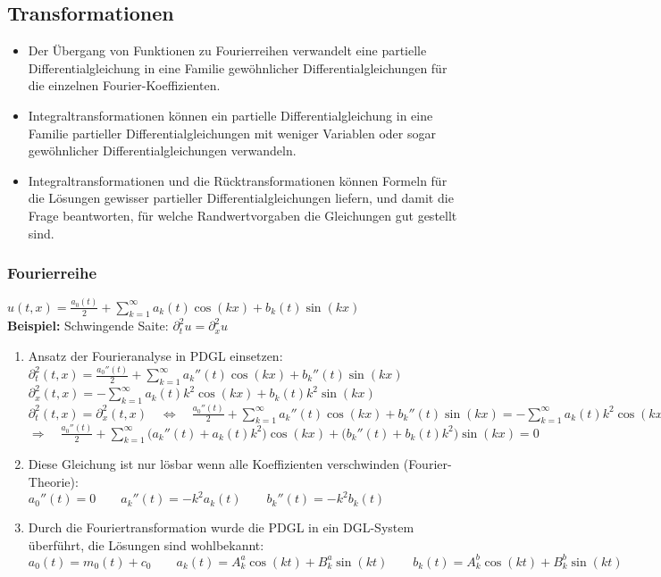 \subsection{Transformationen}


\begin{itemize}
\item Der Übergang von Funktionen zu Fourierreihen verwandelt eine partielle
Differentialgleichung in eine Familie gewöhnlicher Differentialgleichungen für
die einzelnen Fourier-Koeffizienten.
\item Integraltransformationen können ein partielle Differentialgleichung in eine
Familie partieller Differentialgleichungen mit weniger Variablen oder sogar
gewöhnlicher Differentialgleichungen verwandeln.
\item Integraltransformationen und die Rücktransformationen können Formeln
für die Lösungen gewisser partieller Differentialgleichungen liefern, und
damit die Frage beantworten, für welche Randwertvorgaben die Gleichungen
gut gestellt sind.
\end{itemize}

\subsubsection{Fourierreihe}

$\boxed{u(t,x)=\frac{a_0(t)}{2}+\sum\limits_{k=1}^{\infty}{a_k(t)\cos(kx)+b_k(t)\sin(kx)}}$\\[0.4cm]

\textbf{Beispiel:} Schwingende Saite: $\boxed{\partial_t^2u=\partial_x^2u}$

\begin{enumerate}
\item Ansatz der Fourieranalyse in PDGL einsetzen:\\
$\partial_t^2(t,x)=\frac{a_0''(t)}{2}+\sum\limits_{k=1}^{\infty}{a_k''(t)\cos(kx)+b_k''(t)\sin(kx)}$\\
$\partial_x^2(t,x)=-\sum\limits_{k=1}^{\infty}{a_k(t)k^2\cos(kx)+b_k(t)k^2\sin(kx)}$\\
$\partial_t^2(t,x)=\partial_x^2(t,x) 
\quad \Leftrightarrow \quad \frac{a_0''(t)}{2}+\sum\limits_{k=1}^{\infty}{a_k''(t)\cos(kx)+b_k''(t)\sin(kx)}=-\sum\limits_{k=1}^{\infty}{a_k(t)k^2\cos(kx)+b_k(t)k^2\sin(kx)}$\\[0.2cm]
$\boxed{\Rightarrow\quad \frac{a_0''(t)}{2}+\sum\limits_{k=1}^{\infty}{\big(a_k''(t)+a_k(t)k^2\big)\cos(kx)+\big(b_k''(t)+b_k(t)k^2\big)\sin(kx)}=0}$
\item Diese Gleichung ist nur lösbar wenn alle Koeffizienten verschwinden (Fourier-Theorie):\\[0.2cm]
$a_0''(t)=0 \qquad a_k''(t)=-k^2a_k(t)\qquad b_k''(t)=-k^2b_k(t)$
\item Durch die Fouriertransformation wurde die PDGL in ein DGL-System überführt, die Lösungen sind wohlbekannt:\\[0.2cm]
$a_0(t)=m_0(t)+c_0\qquad a_k(t)=A_k^a\cos(kt)+B_k^a\sin(kt)\qquad b_k(t)=A_k^b\cos(kt)+B_k^b\sin(kt)$
\end{enumerate}


